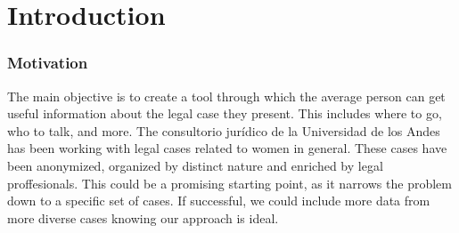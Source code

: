 \chapter{Introduction}
\label{cha:introduction}



\subsection{Motivation} 
The main objective is to create a tool through which the average person can get useful
information about the legal case they present. This includes where to go, who to talk,
and more.   %
The consultorio jurídico de la Universidad de los Andes has been working with 
legal cases related to women in general. These cases have been anonymized, organized 
by distinct nature and enriched by legal proffesionals. This could be a promising starting point, as it narrows the problem
down to a specific set of cases. If successful, we could include more data from more diverse
cases knowing our approach is ideal.

\endinput